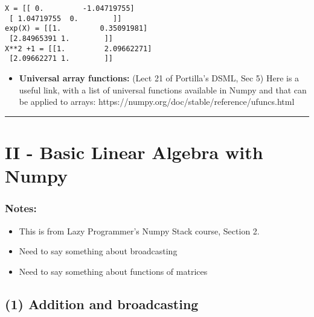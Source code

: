 \documentclass[11pt]{article}
\providecommand{\tightlist}{%
      \setlength{\itemsep}{0pt}\setlength{\parskip}{0pt}}
\begin{document}
    \begin{Verbatim}[commandchars=\\\{\}]
X = [[ 0.         -1.04719755]
 [ 1.04719755  0.        ]]
exp(X) = [[1.         0.35091981]
 [2.84965391 1.        ]]
X**2 +1 = [[1.         2.09662271]
 [2.09662271 1.        ]]
    \end{Verbatim}

    \begin{itemize}
\tightlist
\item
  \textbf{Universal array functions:} (Lect 21 of Portilla's DSML, Sec
  5) Here is a useful link, with a list of universal functions available
  in Numpy and that can be applied to arrays:
  https://numpy.org/doc/stable/reference/ufuncs.html
\end{itemize}

    \begin{center}\rule{0.5\linewidth}{0.5pt}\end{center}

    \hypertarget{ii---basic-linear-algebra-with-numpy}{%
\section{\texorpdfstring{\textbf{II - Basic Linear Algebra with
Numpy}}{II - Basic Linear Algebra with Numpy}}\label{ii---basic-linear-algebra-with-numpy}}

\hypertarget{notes}{%
\subsubsection{Notes:}\label{notes}}

\begin{itemize}
\tightlist
\item
  This is from Lazy Programmer's Numpy Stack course, Section 2.
\item
  Need to say something about broadcasting
\item
  Need to say something about functions of matrices
\end{itemize}

    \hypertarget{addition-and-broadcasting}{%
\subsection{\texorpdfstring{\textbf{(1) Addition and
broadcasting}}{(1) Addition and broadcasting}}\label{addition-and-broadcasting}}
\end{document}
